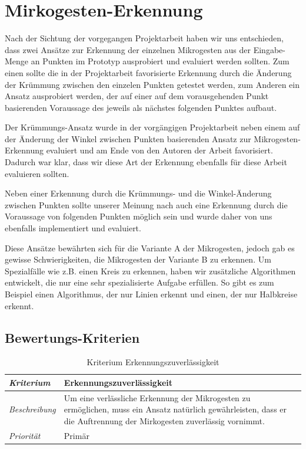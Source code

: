 \chapter{Mirkogesten-Erkennung}

Nach der Sichtung der vorgegangen Projektarbeit haben wir uns entschieden, dass zwei Ansätze zur Erkennung der einzelnen Mikrogesten aus der Eingabe-Menge an Punkten im Prototyp ausprobiert und evaluiert werden sollten. Zum einen sollte die in der Projektarbeit favorisierte Erkennung durch die Änderung der Krümmung zwischen den einzelen Punkten getestet werden, zum Anderen ein Ansatz ausprobiert werden, der auf einer auf dem vorausgehenden Punkt basierenden Voraussage des jeweils als nächstes folgenden Punktes aufbaut.

Der Krümmungs-Ansatz wurde in der vorgängigen Projektarbeit neben einem auf der Änderung der Winkel zwischen Punkten basierenden Ansatz zur Mikrogesten-Erkennung evaluiert und am Ende von den Autoren der Arbeit favorisiert. Dadurch war klar, dass wir diese Art der Erkennung ebenfalls für diese Arbeit evaluieren sollten.

Neben einer Erkennung durch die Krümmungs- und die Winkel-Änderung zwischen Punkten sollte unserer Meinung nach auch eine Erkennung durch die Voraussage von folgenden Punkten möglich sein und wurde daher von uns ebenfalls implementiert und evaluiert.

Diese Ansätze bewährten sich für die Variante A der Mikrogesten, jedoch gab es gewisse Schwierigkeiten, die Mikrogesten der Variante B zu erkennen. Um Spezialfälle wie z.B. einen Kreis zu erkennen, haben wir zusätzliche Algorithmen entwickelt, die nur eine sehr spezialisierte Aufgabe erfüllen. So gibt es zum Beispiel einen Algorithmus, der nur Linien erkennt und einen, der nur Halbkreise erkennt.

\section{Bewertungs-Kriterien}

\begin{table}[h!]
  \begin{center}
    \begin{tabular}{ m{2.2cm} |  p{10cm} }
    \emph{Kriterium} & Erkennungszuverlässigkeit  \\ \hline
    \emph{Beschreibung} & Um eine verlässliche Erkennung der Mikrogesten zu ermöglichen, muss ein Ansatz natürlich gewährleisten, dass er die Auftrennung der Mirkogesten zuverlässig vornimmt. \\ \hline
    \emph{Priorität} & Primär  \\
    \end{tabular}
  \end{center}
  \caption{Kriterium Erkennungszuverl\"{a}ssigkeit}
  \label{kriterium_erkennungszuverlaessigkeit}
\end{table}

